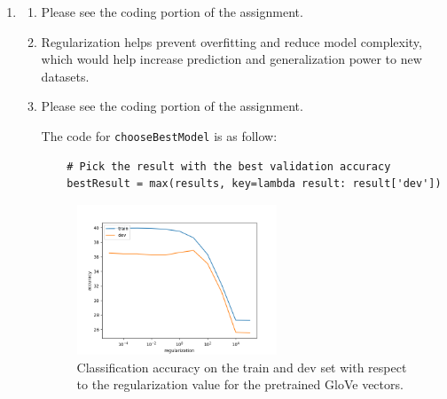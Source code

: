 \documentclass[10pt,reqno]{amsart}
\begin{document}
\begin{enumerate}[topsep=0pt,itemsep=3ex,partopsep=1ex,parsep=1ex]
\item
  \begin{enumerate}[itemsep=2ex]
  \item Please see the coding portion of the assignment.
  \item Regularization helps prevent overfitting and reduce model complexity,
    which would help increase prediction and generalization power to new datasets.
  \item Please see the coding portion of the assignment.
    
    The code for \texttt{chooseBestModel} is as follow:
  \begin{verbatim}
    # Pick the result with the best validation accuracy
    bestResult = max(results, key=lambda result: result['dev'])
  \end{verbatim}


  \begin{figure}[h]
    \includegraphics[width=0.6\textwidth]{../code/q4_reg_v_acc.png}
    \caption{Classification accuracy on the train and dev set with respect to the regularization value for the pretrained GloVe vectors.}
    \label{fig2}
  \end{figure}


\end{enumerate}
\end{enumerate}
\end{document}
